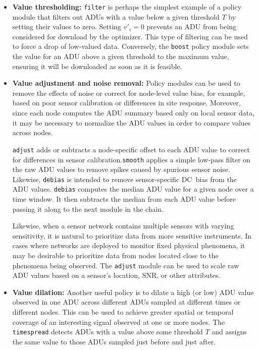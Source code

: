 \begin{itemize}

\item \textbf{Value thresholding:} \texttt{filter} is perhaps the simplest
example of a policy module that filters out ADUs with a value below a given
threshold $T$ by setting their values to zero. Setting $v'_i = 0$ prevents
an ADU from being considered for download by the optimizer. This type of
filtering can be used to force a drop of low-valued data. Conversely, the
\texttt{boost} policy module sets the value for an ADU above a given
threshold to the maximum value, ensuring it will be downloaded as soon as it
is feasible.

\item \textbf{Value adjustment and noise removal:} Policy modules can be used
to remove the effects of noise or correct for node-level value bias, for
example, based on poor sensor calibration or differences in site response.
Moreover, since each node computes the ADU summary based only on local sensor
data, it may be necessary to normalize the ADU values in order to compare
values across nodes.

\texttt{adjust} adds or subtracts a node-specific offset to each ADU value to
correct for differences in sensor calibration.\texttt{smooth} applies a
simple low-pass filter on the raw ADU values to remove spikes caused by
spurious sensor noise. Likewise, \texttt{debias} is intended to remove
sensor-specific DC~bias from the ADU values. \texttt{debias} computes the
median ADU value for a given node over a time window. It then subtracts the
median from each ADU value before passing it along to the next module in the
chain.

Likewise, when a sensor network contains multiple sensors with varying
sensitivity, it is natural to prioritize data from more sensitive
instruments. In cases where networks are deployed to monitor fixed physical
phenomena, it may be desirable to prioritize data from nodes located close to
the phenomena being observed. The \texttt{adjust} module can be used to scale
raw ADU values based on a sensor's location, SNR, or other attributes.

\item \textbf{Value dilation:} Another useful policy is to dilate a high (or
low) ADU value observed in one ADU across different ADUs sampled at different
times or different nodes. This can be used to achieve greater spatial or
temporal coverage of an interesting signal observed at one or more nodes. The
\texttt{timespread} detects ADUs with a value above some threshold $T$ and
assigns the same value to those ADUs sampled just before and just after.


\end{itemize}
